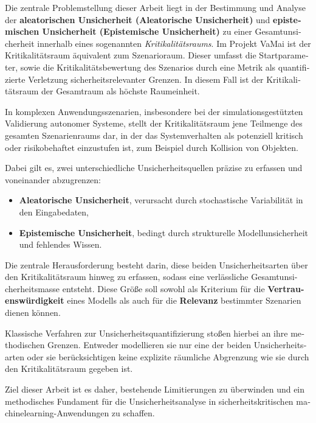\begin{otherlanguage}{ngerman}
Die zentrale Problemstellung dieser Arbeit liegt in der Bestimmung und Analyse der \textbf{aleatorischen Unsicherheit (\gls{Aleatorische Unsicherheit})} und \textbf{epistemischen Unsicherheit (\gls{Epistemische Unsicherheit})} zu einer Gesamtunsicherheit innerhalb eines sogenannten \emph{Kritikalitätsraums}. Im Projekt VaMai ist der Kritikalitätsraum äquivalent zum Szenarioraum. Dieser umfasst die Startparameter, sowie die Kritikalitätsbewertung des Szenarios durch eine Metrik als quantifizierte Verletzung sicherheitsrelevanter Grenzen. In diesem Fall ist der Kritikalitätsraum der Gesamtraum als höchste Raumeinheit. \newline


In komplexen Anwendungsszenarien, insbesondere bei der simulationsgestützten Validierung autonomer Systeme, stellt der Kritikalitätsraum jene Teilmenge des gesamten Szenarienraums dar, in der das Systemverhalten als potenziell kritisch oder risikobehaftet einzustufen ist, zum Beispiel durch Kollision von Objekten.\newline

Dabei gilt es, zwei unterschiedliche Unsicherheitsquellen präzise zu erfassen und voneinander abzugrenzen:

\begin{itemize}
  \item \textbf{\gls{Aleatorische Unsicherheit}}, verursacht durch stochastische Variabilität in den Eingabedaten,
  \item \textbf{\gls{Epistemische Unsicherheit}}, bedingt durch strukturelle Modellunsicherheit und fehlendes Wissen.
\end{itemize}

Die zentrale Herausforderung besteht darin, diese beiden Unsicherheitsarten über den Kritikalitätsraum hinweg zu erfassen, sodass eine verlässliche Gesamtunsicherheitsmasse entsteht. Diese Größe soll sowohl als Kriterium für die \textbf{Vertrauenswürdigkeit} eines Modells als auch für die \textbf{Relevanz} bestimmter Szenarien dienen können.\newline

Klassische Verfahren zur Unsicherheitsquantifizierung stoßen hierbei an ihre methodischen Grenzen. Entweder modellieren sie nur eine der beiden Unsicherheitsarten oder sie berücksichtigen keine explizite räumliche Abgrenzung wie sie durch den Kritikalitätsraum gegeben ist.\newline

Ziel dieser Arbeit ist es daher, bestehende Limitierungen zu überwinden und ein methodisches Fundament für die Unsicherheitsanalyse in sicherheitskritischen \gls{machinelearning}-Anwendungen zu schaffen.
\end{otherlanguage}
